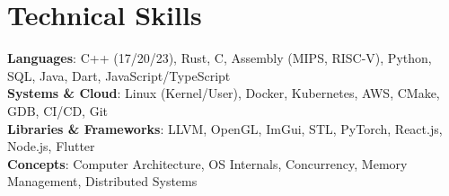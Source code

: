 \documentclass[letterpaper,10pt]{article}
\begin{document}
\section{Technical Skills}
 \begin{itemize}[leftmargin=0.15in, label={}]
    \small{\item{
     \textbf{Languages}{: C++ (17/20/23), Rust, C, Assembly (MIPS, RISC-V), Python, SQL, Java, Dart, JavaScript/TypeScript} \\
     \textbf{Systems \& Cloud}{: Linux (Kernel/User), Docker, Kubernetes, AWS, CMake, GDB, CI/CD, Git} \\
     \textbf{Libraries \& Frameworks}{: LLVM, OpenGL, ImGui, STL, PyTorch, React.js, Node.js, Flutter} \\
     \textbf{Concepts}{: Computer Architecture, OS Internals, Concurrency, Memory Management, Distributed Systems}
    }}
 \end{itemize}
\end{document}
